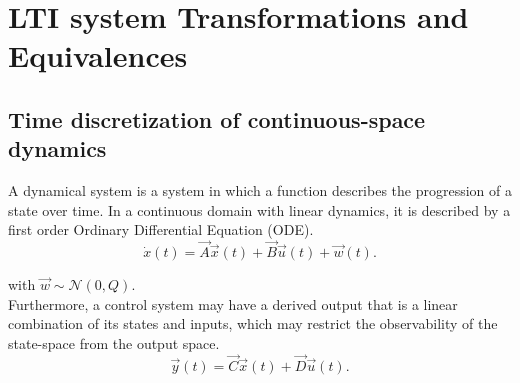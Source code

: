 \documentclass[runningheads,a4paper]{llncs}
\begin{document}
\section{LTI system Transformations and Equivalences} \label{sec:appendix:LTIbackground}

\subsection{Time discretization of continuous-space dynamics}

A dynamical system is a system in which a function describes the progression of a state over time. 
In a continuous domain with linear dynamics, it is described by a first order Ordinary Differential Equation (ODE).
\begin{equation}
\dot{x}(t)=\vec{A}\vec{x}(t)+\vec{B}\vec{u}(t) +\vec{w}(t).
\label{eq:dynamical}
\end{equation}

\noindent with $\vec{w} \sim \mathcal{N}(0,Q)$.\\
Furthermore, a control system may have a derived output that is a linear combination of its states and inputs, 
which may restrict the observability of the state-space from the output space.
\begin{equation}
\vec{y}(t)=\vec{C}\vec{x}(t)+\vec{D}\vec{u}(t).
\end{equation}
\end{document}
